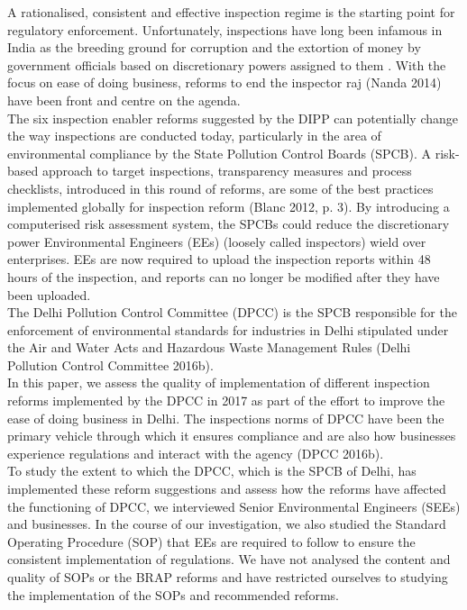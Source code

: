 \documentclass[a4paper, 12pt]{article}
\begin{document}
                  A rationalised, consistent and effective inspection regime is the starting point for regulatory enforcement. Unfortunately, inspections have long been infamous in India as the breeding ground for corruption and the extortion of money by government officials based on discretionary powers assigned to them \parencite{PHD}. With the focus on ease of doing business, reforms to end the inspector raj \parencite{livemint}(Nanda 2014) have been front and centre on the agenda. \\
                  
                  The six inspection enabler reforms suggested by the DIPP can potentially change the way inspections are conducted today, particularly in the area of environmental compliance by the State Pollution Control Boards (SPCB). A risk-based approach to target inspections, transparency measures and process checklists, introduced in this round of reforms, are some of the best practices implemented globally for inspection reform (Blanc 2012, p. 3). By introducing a computerised risk assessment system, the SPCBs could reduce the discretionary power Environmental Engineers (EEs) (loosely called inspectors) wield over enterprises. EEs are now required to upload the inspection reports within 48 hours of the inspection, and reports can no longer be modified after they have been uploaded. \\
                  
                 The Delhi Pollution Control Committee (DPCC) is the SPCB responsible for the enforcement of environmental standards for industries in Delhi stipulated under the Air and Water Acts and Hazardous Waste Management Rules \parencite{DPCCb}(Delhi Pollution Control Committee 2016b). \\
                 
                 In this paper, we assess the quality of implementation of different inspection reforms implemented by the DPCC in 2017 as part of the effort to improve the ease of doing business in Delhi. The inspections norms of DPCC have been the primary vehicle through which it ensures compliance and are also how businesses experience regulations and interact with the agency (DPCC 2016b). \\
                 
                 To study the extent to which the DPCC, which is the SPCB of Delhi, has implemented these reform suggestions and assess how the reforms have affected the functioning of DPCC, we interviewed Senior Environmental Engineers (SEEs) and businesses. In the course of our investigation, we also studied the Standard Operating Procedure (SOP) that EEs are required to follow to ensure the consistent implementation of regulations. We have not analysed the content and quality of SOPs or the BRAP reforms and have restricted ourselves to studying the implementation of the SOPs and recommended reforms. \\
                 
\end{document}
